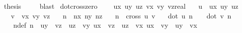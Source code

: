 \begin{isabellebody}
\ {\isacharquery}{\kern0pt}thesis\ \isamarkupfalse%
\ {}\ \isamarkupfalse%
\ blast\isanewline
{}\isamarkupfalse%
%
\endisatagproof
{\isafoldproof}%
%
\isadelimproof
\isanewline
%
\endisadelimproof
\isanewline
{}\isamarkupfalse%
\ dot{\isacharunderscore}{\kern0pt}cross{\isacharunderscore}{\kern0pt}zero{\isacharcolon}{\kern0pt}\ \isanewline
\ \ \ ux\ uy\ uz\ vx\ vy\ vz{\isacharcolon}{\kern0pt}{\isacharcolon}{\kern0pt}{\isachardoublequoteopen}real{\isachardoublequoteclose}\isanewline
\ \ \ {\isachardoublequoteopen}u\ {\isacharequal}{\kern0pt}\ {\isacharparenleft}{\kern0pt}ux{\isacharcomma}{\kern0pt}\ uy{\isacharcomma}{\kern0pt}\ uz{\isacharparenright}{\kern0pt}{\isachardoublequoteclose}\isanewline
\ \ \ {\isachardoublequoteopen}v\ {\isacharequal}{\kern0pt}\ {\isacharparenleft}{\kern0pt}vx{\isacharcomma}{\kern0pt}\ vy{\isacharcomma}{\kern0pt}\ vz{\isacharparenright}{\kern0pt}{\isachardoublequoteclose}\isanewline
\ \ \ {\isachardoublequoteopen}n\ {\isacharequal}{\kern0pt}\ {\isacharparenleft}{\kern0pt}nx{\isacharcomma}{\kern0pt}\ ny{\isacharcomma}{\kern0pt}\ nz{\isacharparenright}{\kern0pt}{\isachardoublequoteclose}\isanewline
\ \ \ {\isachardoublequoteopen}n\ {\isacharequal}{\kern0pt}\ cross\ u\ v{\isachardoublequoteclose}\isanewline
\ \ \ {\isachardoublequoteopen}{\isacharparenleft}{\kern0pt}dot\ u\ n\ {\isacharequal}{\kern0pt}\ {}{\isacharparenright}{\kern0pt}{\isachardoublequoteclose}\ \ {\isachardoublequoteopen}{\isacharparenleft}{\kern0pt}dot\ v\ n\ {\isacharequal}{\kern0pt}\ {}{\isacharparenright}{\kern0pt}{\isachardoublequoteclose}\isanewline
%
\isadelimproof
%
\endisadelimproof
%
\isatagproof
{}\isamarkupfalse%
\ {\isacharminus}{\kern0pt}\isanewline
\ \ \isamarkupfalse%
\ ndef{\isacharcolon}{\kern0pt}\ {\isachardoublequoteopen}n\ {\isacharequal}{\kern0pt}\ {\isacharparenleft}{\kern0pt}uy\ {\isacharasterisk}{\kern0pt}\ vz\ {\isacharminus}{\kern0pt}\ uz\ {\isacharasterisk}{\kern0pt}\ vy{\isacharcomma}{\kern0pt}\ {\isacharminus}{\kern0pt}ux\ {\isacharasterisk}{\kern0pt}\ vz\ {\isacharplus}{\kern0pt}\ uz\ {\isacharasterisk}{\kern0pt}\ vx{\isacharcomma}{\kern0pt}\ ux\ {\isacharasterisk}{\kern0pt}\ vy\ {\isacharminus}{\kern0pt}\ uy\ {\isacharasterisk}{\kern0pt}\ vx{\isacharparenright}{\kern0pt}{\isachardoublequoteclose}\ \isamarkupfalse%

\end{isabellebody}
